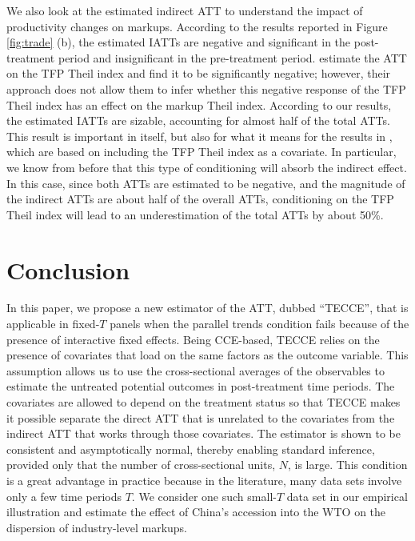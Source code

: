 \documentclass[12pt,fleqn]{article}
\begin{document}
  We also look at the estimated indirect ATT to understand the impact of productivity changes on markups. According to the results reported in Figure \ref{fig:trade} (b), the estimated IATTs are negative and significant in the post-treatment period and insignificant in the pre-treatment period. \citet{lu2015trade} estimate the ATT on the TFP Theil index and find it to be significantly negative; however, their approach does not allow them to infer whether this negative response of the TFP Theil index has an effect on the markup Theil index. According to our results, the estimated IATTs are sizable, accounting for almost half of the total ATTs. This result is important in itself, but also for what it means for the results in \citet{lu2015trade}, which are based on including the TFP Theil index as a covariate. In particular, we know from before that this type of conditioning will absorb the indirect effect. In this case, since both ATTs are estimated to be negative, and the magnitude of the indirect ATTs are about half of the overall ATTs, conditioning on the TFP Theil index will lead to an underestimation of the total ATTs by about 50\%.
  
  \section{Conclusion}
  
  In this paper, we propose a new estimator of the ATT, dubbed ``TECCE'', that is applicable in fixed-$T$ panels when the parallel trends condition fails because of the presence of interactive fixed effects. Being CCE-based, TECCE relies on the presence of covariates that load on the same factors as the outcome variable. This assumption allows us to use the cross-sectional averages of the observables to estimate the untreated potential outcomes in post-treatment time periods. The covariates are allowed to depend on the treatment status so that TECCE makes it possible separate the direct ATT that is unrelated to the covariates from the indirect ATT that works through those covariates. The estimator is shown to be consistent and asymptotically normal, thereby enabling standard inference, provided only that the number of cross-sectional units, $N$, is large. This condition is a great advantage in practice because in the literature, many data sets involve only a few time periods $T$. We consider one such small-$T$ data set in our empirical illustration and estimate the effect of China's accession into the WTO on the dispersion of industry-level markups.
  
\end{document}

